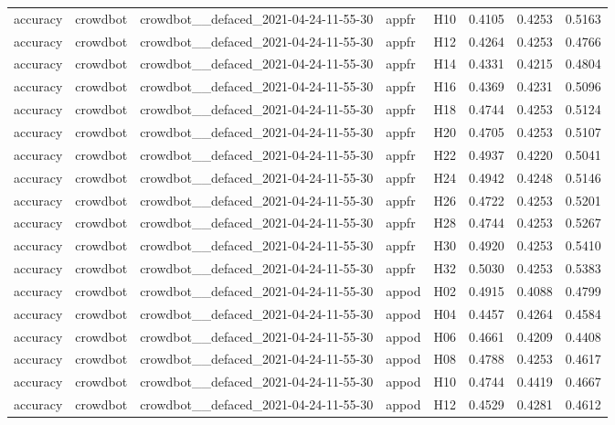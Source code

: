 \begin{table}[tbp]
\begin{tabular}{lllllrrr}
accuracy & crowdbot & crowdbot\_\_defaced\_2021-04-24-11-55-30 & appfr & H10 & 0.4105 & 0.4253 & 0.5163 \\
accuracy & crowdbot & crowdbot\_\_defaced\_2021-04-24-11-55-30 & appfr & H12 & 0.4264 & 0.4253 & 0.4766 \\
accuracy & crowdbot & crowdbot\_\_defaced\_2021-04-24-11-55-30 & appfr & H14 & 0.4331 & 0.4215 & 0.4804 \\
accuracy & crowdbot & crowdbot\_\_defaced\_2021-04-24-11-55-30 & appfr & H16 & 0.4369 & 0.4231 & 0.5096 \\
accuracy & crowdbot & crowdbot\_\_defaced\_2021-04-24-11-55-30 & appfr & H18 & 0.4744 & 0.4253 & 0.5124 \\
accuracy & crowdbot & crowdbot\_\_defaced\_2021-04-24-11-55-30 & appfr & H20 & 0.4705 & 0.4253 & 0.5107 \\
accuracy & crowdbot & crowdbot\_\_defaced\_2021-04-24-11-55-30 & appfr & H22 & 0.4937 & 0.4220 & 0.5041 \\
accuracy & crowdbot & crowdbot\_\_defaced\_2021-04-24-11-55-30 & appfr & H24 & 0.4942 & 0.4248 & 0.5146 \\
accuracy & crowdbot & crowdbot\_\_defaced\_2021-04-24-11-55-30 & appfr & H26 & 0.4722 & 0.4253 & 0.5201 \\
accuracy & crowdbot & crowdbot\_\_defaced\_2021-04-24-11-55-30 & appfr & H28 & 0.4744 & 0.4253 & 0.5267 \\
accuracy & crowdbot & crowdbot\_\_defaced\_2021-04-24-11-55-30 & appfr & H30 & 0.4920 & 0.4253 & 0.5410 \\
accuracy & crowdbot & crowdbot\_\_defaced\_2021-04-24-11-55-30 & appfr & H32 & 0.5030 & 0.4253 & 0.5383 \\
accuracy & crowdbot & crowdbot\_\_defaced\_2021-04-24-11-55-30 & appod & H02 & 0.4915 & 0.4088 & 0.4799 \\
accuracy & crowdbot & crowdbot\_\_defaced\_2021-04-24-11-55-30 & appod & H04 & 0.4457 & 0.4264 & 0.4584 \\
accuracy & crowdbot & crowdbot\_\_defaced\_2021-04-24-11-55-30 & appod & H06 & 0.4661 & 0.4209 & 0.4408 \\
accuracy & crowdbot & crowdbot\_\_defaced\_2021-04-24-11-55-30 & appod & H08 & 0.4788 & 0.4253 & 0.4617 \\
accuracy & crowdbot & crowdbot\_\_defaced\_2021-04-24-11-55-30 & appod & H10 & 0.4744 & 0.4419 & 0.4667 \\
accuracy & crowdbot & crowdbot\_\_defaced\_2021-04-24-11-55-30 & appod & H12 & 0.4529 & 0.4281 & 0.4612 \\

\end{tabular}
\end{table}
